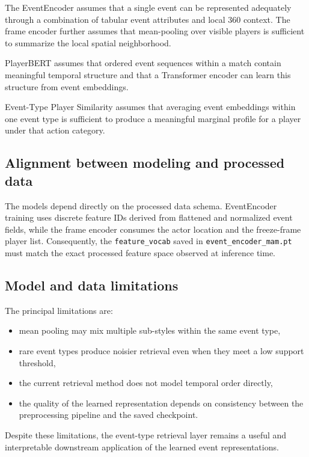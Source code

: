 \documentclass[11pt]{article}
\begin{document}
The EventEncoder assumes that a single event can be represented adequately through a combination of tabular event attributes and local 360 context. The frame encoder further assumes that mean-pooling over visible players is sufficient to summarize the local spatial neighborhood.

PlayerBERT assumes that ordered event sequences within a match contain meaningful temporal structure and that a Transformer encoder can learn this structure from event embeddings.

Event-Type Player Similarity assumes that averaging event embeddings within one event type is sufficient to produce a meaningful marginal profile for a player under that action category.

\subsection{Alignment between modeling and processed data}

The models depend directly on the processed data schema. EventEncoder training uses discrete feature IDs derived from flattened and normalized event fields, while the frame encoder consumes the actor location and the freeze-frame player list. Consequently, the \texttt{feature\_vocab} saved in \texttt{event\_encoder\_mam.pt} must match the exact processed feature space observed at inference time.

\subsection{Model and data limitations}

The principal limitations are:
\begin{itemize}[leftmargin=*]
  \item mean pooling may mix multiple sub-styles within the same event type,
  \item rare event types produce noisier retrieval even when they meet a low support threshold,
  \item the current retrieval method does not model temporal order directly,
  \item the quality of the learned representation depends on consistency between the preprocessing pipeline and the saved checkpoint.
\end{itemize}

Despite these limitations, the event-type retrieval layer remains a useful and interpretable downstream application of the learned event representations.
\end{document}
